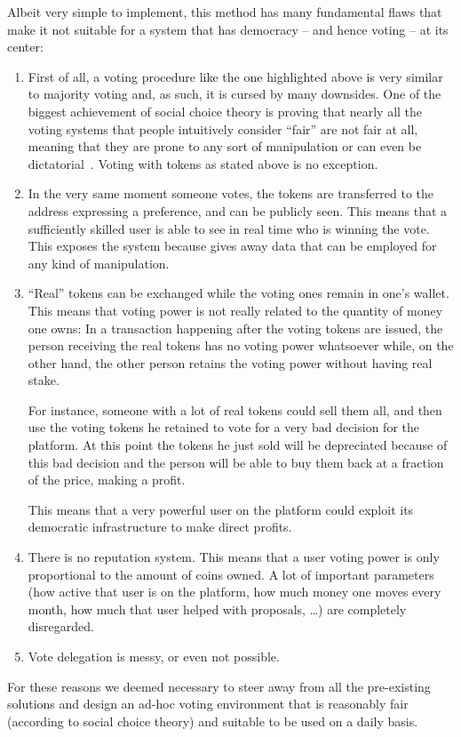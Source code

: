 \documentclass[submission, copyright,creativecommons,sharealike,noncommercial]{eptcs}
\begin{document}
	Albeit very simple to implement, this method has many fundamental flaws that make it not suitable for a system that has democracy -- and hence voting -- at its center:
	\begin{enumerate}	
		\item First of all, a voting procedure like the one highlighted above is very similar to majority voting and, as such, it is cursed by many downsides. One of the biggest achievement of social choice theory is proving that nearly all the voting systems that people intuitively consider ``fair'' are not fair at all, meaning that they are prone to any sort of manipulation or can even be dictatorial~\cite{Arrow1951, Satterthwaite1975, Gibbard1973}. Voting with tokens as stated above is no exception. 
		\item In the very same moment someone votes, the tokens are transferred to the address expressing a preference, and can be publicly seen. This means that a sufficiently skilled user is able to see in real time who is winning the vote. This exposes the system because gives away data that can be employed for any kind of manipulation.
		\item ``Real'' tokens can be exchanged while the voting ones remain in one's wallet. This means that voting power is not really related to the quantity of money one owns: In a transaction happening after the voting tokens are issued, the person receiving the real tokens has no voting power whatsoever while, on the other hand, the other person retains the voting power without having real stake.
		
		For instance, someone with a lot of real tokens could sell them all, and then use the voting tokens he retained to vote for a very bad decision for the platform. At this point the tokens he just sold will be depreciated because of this bad decision and the person will be able to buy them back at a fraction of the price, making a profit. 
		
		This means that a very powerful user on the platform could exploit its democratic infrastructure to make direct profits.
		\item There is no reputation system. This means that a user voting power is only proportional to the amount of coins owned. A lot of important parameters (how active that user is on the platform, how much money one moves every month, how much that user helped with proposals, \dots) are completely disregarded.
		\item Vote delegation is messy, or even not possible.
	\end{enumerate}
%
	For these reasons we deemed necessary to steer away from all the pre-existing solutions and design an ad-hoc voting environment that is reasonably fair (according to social choice theory) and suitable to be used on a daily basis.
%
%
\end{document}
